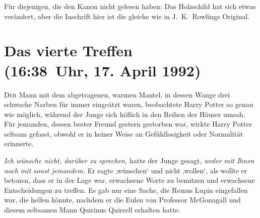 
\begin{chapterOpeningAuthorNote}
Für diejenigen, die den Kanon nicht gelesen haben: Das Holzschild hat sich etwas verändert, aber die Inschrift hier ist die gleiche wie in J.~K.~Rowlings Original.
\end{chapterOpeningAuthorNote}

\section{Das vierte Treffen\\
(16:38~Uhr, 17. April 1992)}

\lettrine{D}{er} Mann mit dem abgetragenen, warmen Mantel, in dessen Wange drei schwache Narben für immer eingeätzt waren, beobachtete Harry Potter so genau wie möglich, während der Junge sich höflich in den Reihen der Häuser umsah. Für jemanden, dessen bester Freund gestern gestorben war, wirkte Harry Potter seltsam gefasst, obwohl er in keiner Weise an Gefühllosigkeit oder Normalität erinnerte.

\emph{Ich wünsche nicht, darüber zu sprechen,} hatte der Junge gesagt, \emph{weder mit Ihnen noch mit sonst jemandem.} Er sagte ‚wünschen‘ und nicht ‚wollen‘, als wollte er betonen, dass er in der Lage war, erwachsene Worte zu benutzen und erwachsene Entscheidungen zu treffen. Es gab nur eine Sache, die Remus Lupin eingefallen war, die helfen könnte, nachdem er die Eulen von Professor McGonagall und diesem seltsamen Mann Quirinus Quirrell erhalten hatte.

